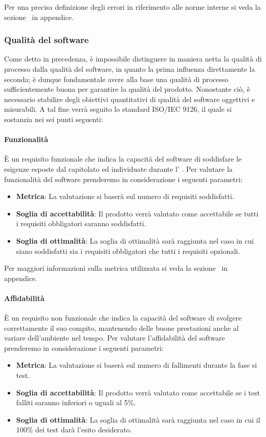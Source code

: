 Per una precisa definizione degli errori in riferimento alle norme interne si veda la sezione~ in appendice.

\subsubsection{Qualità del software}
Come detto in precedenza, è impossibile distinguere in maniera netta la qualità di processo dalla qualità del software, in quanto la prima influenza direttamente la seconda; è dunque fondamentale avere alla base una qualità di processo sufficientemente buona per garantire la qualità del prodotto. Nonostante ciò, è necessario stabilire degli obiettivi quantitativi di qualità del software oggettivi e misurabili. A tal fine verrà seguito lo standard ISO/IEC 9126, il quale si sostanzia nei sei punti seguenti:

\paragraph{Funzionalità}
È un requisito funzionale che indica la capacità del software di soddisfare le esigenze esposte dal capitolato ed individuate durante l’ \AdR .
Per valutare la funzionalità del software prenderemo in considerazione i seguenti parametri:
\begin{itemize}
	\item \textbf{Metrica}: La valutazione si baserà sul numero di requisiti soddisfatti.
	\item \textbf{Soglia di accettabilità}: Il prodotto verrà valutato come accettabile se tutti i requisiti obbligatori saranno soddisfatti.
	\item \textbf{Soglia di ottimalità}: La soglia di ottimalità sarà raggiunta nel caso in cui siano soddisfatti sia i requisiti obbligatori che tutti i requisiti opzionali.
\end{itemize}

Per maggiori informazioni sulla metrica utilizzata si veda la sezione~ in appendice.


\paragraph{Affidabilità}
È un requisito non funzionale che indica la capacità del software di svolgere correttamente il suo compito, mantenendo delle buone prestazioni anche al variare dell’ambiente nel tempo.
Per valutare l'affidabilità del software prenderemo in considerazione i seguenti parametri:
\begin{itemize}
	\item \textbf{Metrica}: La valutazione si baserà sul numero di fallimenti durante la fase si test.
	\item \textbf{Soglia di accettabilità}: Il prodotto verrà valutato come accettabile se i test falliti saranno inferiori o uguali al 5\%.
	\item \textbf{Soglia di ottimalità}: La soglia di ottimalità sarà raggiunta nel caso in cui il 100\% dei test darà l'esito desiderato.
\end{itemize}

